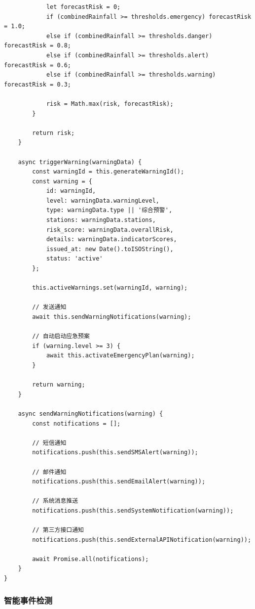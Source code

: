 \begin{lstlisting}
            let forecastRisk = 0;
            if (combinedRainfall >= thresholds.emergency) forecastRisk = 1.0;
            else if (combinedRainfall >= thresholds.danger) forecastRisk = 0.8;
            else if (combinedRainfall >= thresholds.alert) forecastRisk = 0.6;
            else if (combinedRainfall >= thresholds.warning) forecastRisk = 0.3;
            
            risk = Math.max(risk, forecastRisk);
        }
        
        return risk;
    }
    
    async triggerWarning(warningData) {
        const warningId = this.generateWarningId();
        const warning = {
            id: warningId,
            level: warningData.warningLevel,
            type: warningData.type || '综合预警',
            stations: warningData.stations,
            risk_score: warningData.overallRisk,
            details: warningData.indicatorScores,
            issued_at: new Date().toISOString(),
            status: 'active'
        };
        
        this.activeWarnings.set(warningId, warning);
        
        // 发送通知
        await this.sendWarningNotifications(warning);
        
        // 自动启动应急预案
        if (warning.level >= 3) {
            await this.activateEmergencyPlan(warning);
        }
        
        return warning;
    }
    
    async sendWarningNotifications(warning) {
        const notifications = [];
        
        // 短信通知
        notifications.push(this.sendSMSAlert(warning));
        
        // 邮件通知
        notifications.push(this.sendEmailAlert(warning));
        
        // 系统消息推送
        notifications.push(this.sendSystemNotification(warning));
        
        // 第三方接口通知
        notifications.push(this.sendExternalAPINotification(warning));
        
        await Promise.all(notifications);
    }
}
\end{lstlisting}

\subsubsection{智能事件检测}\label{ux667aux80fdux4e8bux4ef6ux68c0ux6d4b}

